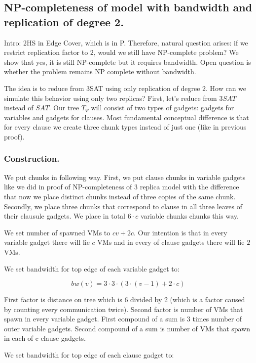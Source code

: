 \subsection{NP-completeness of model with bandwidth and replication of
  degree 2.
}

Intro: 2HS in Edge Cover, which is in P. Therefore, natural question
arises: if we restrict replication factor to 2, would we still have
NP-complete problem? We show that yes, it is still NP-complete but it
requires bandwidth. Open question is whether the problem remains NP
complete without bandwidth.

The idea is to reduce from 3SAT using only replication of degree
$2$. How can we simulate this behavior using only two replicas? First,
let's reduce from $3SAT$ instead of $SAT$. Our tree $T_{\Psi}$
will consist of two types of gadgets: gadgets for variables and
gadgets for clauses. Most fundamental conceptual difference is that
for every clause we create three chunk types instead of just one (like
in previous proof). 

\subsubsection{Construction.}

We put chunks in following way. First, we put clause chunks in
variable gadgets like we did in proof of NP-completeness of 3 replica
model with the difference that now we place distinct chunks instead of
three copies of the same chunk.  Secondly, we place three chunks that
correspond to clause in all three leaves of their clausule gadgets. We
place in total $6 \cdot c$ variable chunks chunks this way.

We set number of spawned VMs to $cv + 2c$. Our intention is that in
every variable gadget there will lie $c$ VMs and in every of clause
gadgets there will lie $2$ VMs.

We set bandwidth for top edge of each variable gadget to:

$$ bw(v) = 3  \cdot  3  \cdot  (3  \cdot  (v - 1) + 2  \cdot  c) $$


First factor is distance on tree which is 6 divided by 2 (which is a
factor caused by counting every communication twice). Second factor is
number of VMs that spawn in every variable gadget. First compound of a
sum is 3 times number of outer variable gadgets. Second compound of a
sum is number of VMs that spawn in each of c clause gadgets.

We set bandwidth for top edge of each clause gadget to:

